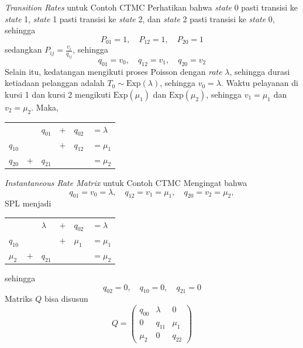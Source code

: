 \documentclass{beamer}
\begin{document}
\begin{frame}{\textit{Transition Rates} untuk Contoh CTMC}
    Perhatikan bahwa \textit{state} 0 pasti transisi ke \textit{state} 1, \textit{state} 1 pasti transisi ke \textit{state} 2, dan \textit{state} 2 pasti transisi ke \textit{state} 0, sehingga
    \[P_{01} = 1, \quad P_{12} = 1, \quad P_{20} = 1\]
    sedangkan \(P_{ij} = \frac{v_i}{q_{ij}}\), sehingga
    \[q_{01} = v_0, \quad q_{12} = v_1, \quad q_{20} = v_2\]
    Selain itu, kedatangan mengikuti proses Poisson dengan \textit{rate} \(\lambda\), sehingga durasi ketiadaan pelanggan adalah \(T_0 \sim \text{Exp}(\lambda)\), sehingga \(v_0 = \lambda\). Waktu pelayanan di kursi 1 dan kursi 2 mengikuti \(\text{Exp}(\mu_1)\) dan \(\text{Exp}(\mu_2)\), sehingga \(v_1 = \mu_1\) dan \(v_2 = \mu_2\). Maka,
    \begin{center}
    \begin{tabular}{llllll}
                   &      &\(q_{01}\) &\(+\) &\(q_{02}\) &\(= \lambda\) \\
        \(q_{10}\) &      &           &\(+\) &\(q_{12}\) &\(= \mu_1\) \\
        \(q_{20}\) &\(+\) &\(q_{21}\) &      &           &\(= \mu_2\)
    \end{tabular}
    \end{center}
\end{frame}

\begin{frame}{\textit{Instantaneous Rate Matrix} untuk Contoh CTMC}
    Mengingat bahwa
    \[q_{01} = v_0 = \lambda, \quad q_{12} = v_1 = \mu_1, \quad q_{20} = v_2 = \mu_2,\]
    SPL menjadi
    \begin{center}
        \begin{tabular}{llllll}
                       &      &\(\lambda\) &\(+\) &\(q_{02}\) &\(= \lambda\) \\
            \(q_{10}\) &      &            &\(+\) &\(\mu_1\)  &\(= \mu_1\) \\
            \(\mu_2\)  &\(+\) &\(q_{21}\)  &      &           &\(= \mu_2\)
        \end{tabular}
    \end{center}
    sehingga
    \[q_{02} = 0, \quad q_{10} = 0, \quad q_{21} = 0\]
    Matriks \(Q\) bisa disusun
    \[Q = \begin{pmatrix}
        q_{00} & \lambda & 0     \\
        0      & q_{11}  & \mu_1 \\
        \mu_2  & 0       & q_{22}
    \end{pmatrix}\]
\end{frame}
\end{document}
